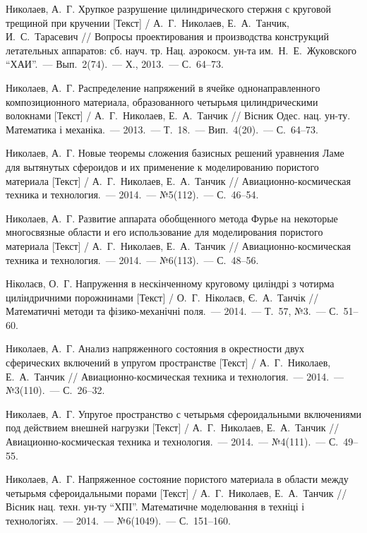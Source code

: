 \begin{biblist}{99}
Николаев, А.~Г. 
Хрупкое разрушение цилиндрического стержня с круговой трещиной при кручении [Текст] 
/ А.~Г.~Николаев, Е.~А.~Танчик, И.~С.~Тарасевич 
// Вопросы проектирования и производства конструкций летательных аппаратов: сб. науч. тр. Нац. аэрокосм. ун-та им.~Н.~Е.~Жуковского ``ХАИ''.~--- Вып.~2(74).~--- Х., 2013.~--- С.~64--73.

Николаев, А.~Г. 
Распределение напряжений в ячейке однонаправленного композиционного материала, образованного четырьмя цилиндрическими волокнами [Текст] / А.~Г.~Николаев, Е.~А.~Танчик 
// Вісник Одес. нац. ун-ту. Математика і механіка.~--- 2013.~--- Т.~18.~--- Вип.~4(20).~--- С.~64--73.

Николаев, А.~Г. 
Новые теоремы сложения базисных решений уравнения Ламе для вытянутых сфероидов и их применение к моделированию пористого материала [Текст] 
/ А.~Г.~Николаев, Е.~А.~Танчик 
// Авиационно-космическая техника и технология.~--- 2014.~--- №5(112).~--- С.~46--54.

Николаев, А.~Г. 
Развитие аппарата обобщенного метода Фурье на некоторые многосвязные области и его использование для моделирования пористого материала [Текст] 
/ А.~Г.~Николаев, Е.~А.~Танчик 
// Авиационно-космическая техника и технология.~--- 2014.~--- №6(113).~--- С.~48--56.

Ніколаєв, О.~Г. 
Напруження в нескінченному круговому циліндрі з чотирма циліндричними порожнинами [Текст] 
/ О.~Г.~Ніколаєв, Є.~А.~Танчік 
// Математичні методи та фізико-механічні поля.~--- 2014.~--- Т.~57, №3.~--- С.~51--60.

Николаев, А.~Г. 
Анализ напряженного состояния в окрестности двух сферических включений в упругом пространстве [Текст] 
/ А.~Г.~Николаев, Е.~А.~Танчик 
// Авиационно-космическая техника и технология.~--- 2014.~--- №3(110).~--- С.~26--32.

Николаев, А.~Г. 
Упругое пространство с четырьмя сфероидальными включениями под действием внешней нагрузки [Текст] 
/ А.~Г.~Николаев, Е.~А.~Танчик 
// Авиационно-космическая техника и технология.~--- 2014.~--- №4(111).~--- С.~49--55.

Николаев, А.~Г. 
Напряженное состояние пористого материала в области между четырьмя сфероидальными порами [Текст] 
/ А.~Г.~Николаев, Е.~А.~Танчик 
// Вісник нац. техн. ун-ту ``ХПІ''. Математичне моделювання в техніці і технологіях.~--- 2014.~--- №6(1049).~--- С.~151--160.


\end{biblist}
